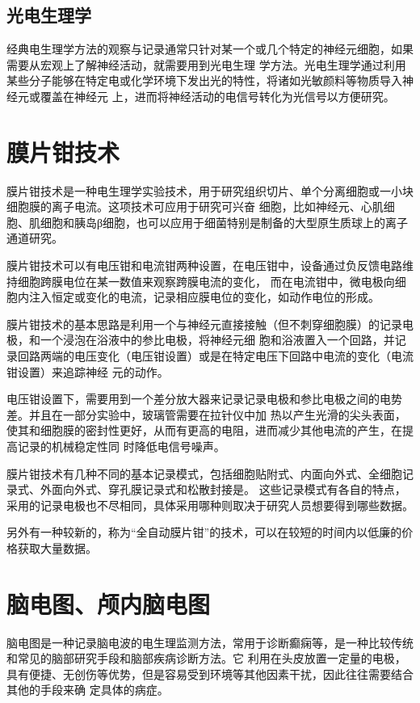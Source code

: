 \documentclass[scheme=plain,12pt]{ctexart}
\begin{document}
    \subsection{光电生理学}

    经典电生理学方法的观察与记录通常只针对某一个或几个特定的神经元细胞，如果需要从宏观上了解神经活动，就需要用到光电生理
    学方法。光电生理学通过利用某些分子能够在特定电或化学环境下发出光的特性，将诸如光敏颜料等物质导入神经元或覆盖在神经元
    上，进而将神经活动的电信号转化为光信号以方便研究。

    \section{膜片钳技术}

    膜片钳技术是一种电生理学实验技术，用于研究组织切片、单个分离细胞或一小块细胞膜的离子电流。这项技术可应用于研究可兴奋
    细胞，比如神经元、心肌细胞、肌细胞和胰岛β细胞，也可以应用于细菌特别是制备的大型原生质球上的离子通道研究。

    膜片钳技术可以有电压钳和电流钳两种设置，在电压钳中，设备通过负反馈电路维持细胞跨膜电位在某一数值来观察跨膜电流的变化，
    而在电流钳中，微电极向细胞内注入恒定或变化的电流，记录相应膜电位的变化，如动作电位的形成。

    膜片钳技术的基本思路是利用一个与神经元直接接触（但不刺穿细胞膜）的记录电极，和一个浸泡在浴液中的参比电极，将神经元细
    胞和浴液置入一个回路，并记录回路两端的电压变化（电压钳设置）或是在特定电压下回路中电流的变化（电流钳设置）来追踪神经
    元的动作。

    电压钳设置下，需要用到一个差分放大器来记录记录电极和参比电极之间的电势差。并且在一部分实验中，玻璃管需要在拉针仪中加
    热以产生光滑的尖头表面，使其和细胞膜的密封性更好，从而有更高的电阻，进而减少其他电流的产生，在提高记录的机械稳定性同
    时降低电信号噪声。

    膜片钳技术有几种不同的基本记录模式，包括细胞贴附式、内面向外式、全细胞记录式、外面向外式、穿孔膜记录式和松散封接是。
    这些记录模式有各自的特点，采用的记录电极也不尽相同，具体采用哪种则取决于研究人员想要得到哪些数据。

    另外有一种较新的，称为``全自动膜片钳''的技术，可以在较短的时间内以低廉的价格获取大量数据。

    \section{脑电图、颅内脑电图}

    脑电图是一种记录脑电波的电生理监测方法，常用于诊断癫痫等，是一种比较传统和常见的脑部研究手段和脑部疾病诊断方法。它
    利用在头皮放置一定量的电极，具有便捷、无创伤等优势，但是容易受到环境等其他因素干扰，因此往往需要结合其他的手段来确
    定具体的病症。
\end{document}
